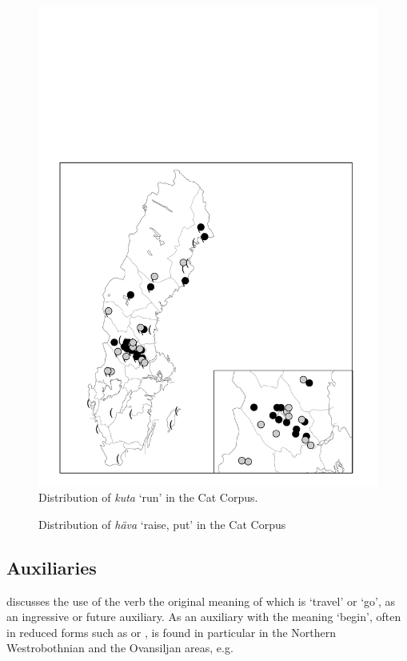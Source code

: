 \begin{figure}[h] 
\includegraphics[height=.5\textheight]{figures/31_DistributionofKuta}
\caption{Distribution of \textit{kuta} ‘run’ in the Cat Corpus.}
\label{map:27}
\end{figure}

 

\begin{figure}[h] 
\caption{Distribution of \textit{häva} ‘raise, put’ in the Cat Corpus}
\label{map:28}
\end{figure}

\subsection{Auxiliaries}

\citet{Holm1941} discusses the use of the verb the original meaning of which is ‘travel’ or ‘go’, as an ingressive or future auxiliary. As an auxiliary with the meaning ‘begin’, often in reduced forms such as  or , is found in particular in the Northern Westrobothnian and the Ovansiljan areas, e.g. 

